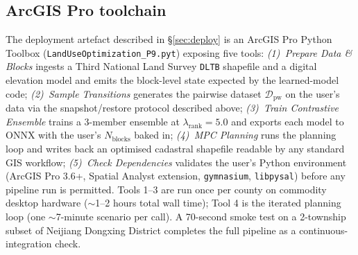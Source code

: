 \documentclass[11pt]{article}
\begin{document}
\subsection{ArcGIS Pro toolchain}\label{sec:methods-toolchain}

The deployment artefact described in \S\ref{sec:deploy} is an ArcGIS Pro Python Toolbox (\texttt{LandUseOptimization\_P9.pyt}) exposing five tools: \emph{(1)~Prepare Data \& Blocks} ingests a Third National Land Survey \texttt{DLTB} shapefile and a digital elevation model and emits the block-level state expected by the learned-model code; \emph{(2)~Sample Transitions} generates the pairwise dataset $\mathcal{D}_{\text{pw}}$ on the user's data via the snapshot/restore protocol described above; \emph{(3)~Train Contrastive Ensemble} trains a 3-member ensemble at $\lambda_{\text{rank}}{=}5.0$ and exports each model to ONNX with the user's $N_{\text{blocks}}$ baked in; \emph{(4)~MPC Planning} runs the planning loop and writes back an optimised cadastral shapefile readable by any standard GIS workflow; \emph{(5)~Check Dependencies} validates the user's Python environment (ArcGIS Pro 3.6+, Spatial Analyst extension, \texttt{gymnasium}, \texttt{libpysal}) before any pipeline run is permitted. Tools 1--3 are run once per county on commodity desktop hardware ($\sim$1--2 hours total wall time); Tool 4 is the iterated planning loop (one $\sim$7-minute scenario per call). A 70-second smoke test on a 2-township subset of Neijiang Dongxing District completes the full pipeline as a continuous-integration check.
\end{document}

